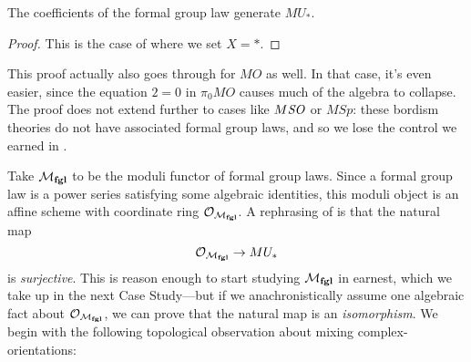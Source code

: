 \begin{corollary}\label{QuillenSurjective}
The coefficients of the formal group law generate \(MU_*\).
\end{corollary}
\begin{proof}
This is the case of  where we set \(X = *\).
\end{proof}

\begin{remark}
This proof actually also goes through for \(MO\) as well.  In that case, it's even easier, since the equation \(2 = 0\) in \(\pi_0 MO\) causes much of the algebra to collapse.  The proof does not extend further to cases like \(M\mathit{SO}\) or \(M\mathit{Sp}\): these bordism theories do not have associated formal group laws, and so we lose the control we earned in .
\end{remark}

Take \(\mathcal{M}_{\mathbf{fgl}}\) to be the moduli functor of formal group laws.  Since a formal group law is a power series satisfying some algebraic identities, this moduli object is an affine scheme with coordinate ring \(\mathcal{O}_{\mathcal{M}_{\mathbf{fgl}}}\).  A rephrasing of  is that the natural map \[\mathcal{O}_{\mathcal{M}_{\mathbf{fgl}}} \to MU_*\] is \emph{surjective}.  This is reason enough to start studying \(\mathcal{M}_{\mathbf{fgl}}\) in earnest, which we take up in the next Case Study---but if we anachronistically assume one algebraic fact about \(\mathcal{O}_{\mathcal{M}_{\mathbf{fgl}}}\), we can prove that the natural map is an \emph{isomorphism}.  We begin with the following topological observation about mixing complex-orientations:

